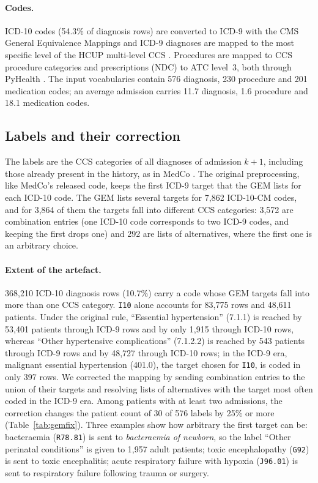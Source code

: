 \documentclass[11pt]{article}
\begin{document}
\paragraph{Codes.} ICD-10 codes (54.3\% of diagnosis rows) are converted to ICD-9 with the CMS General
Equivalence Mappings \citep{cms2018gem} and ICD-9 diagnoses are mapped to the most specific level of the HCUP
multi-level CCS \citep{hcup2015}. Procedures are mapped to CCS procedure categories and prescriptions (NDC) to ATC
level~3, both through PyHealth \citep{yang2023pyhealth}. The input vocabularies contain 576 diagnosis, 230
procedure and 201 medication codes; an average admission carries 11.7 diagnosis, 1.6 procedure and 18.1
medication codes.

\subsection{Labels and their correction}\label{sec:labelfix}

The labels are the CCS categories of all diagnoses of admission $k+1$, including those already present in the
history, as in MedCo \citep{medco2026}. The original preprocessing, like MedCo's released code, keeps the first
ICD-9 target that the GEM lists for each ICD-10 code. The GEM lists several targets for 7,862 ICD-10-CM codes, and
for 3,864 of them the targets fall into different CCS categories: 3,572 are combination entries (one ICD-10 code
corresponds to two ICD-9 codes, and keeping the first drops one) and 292 are lists of alternatives, where the
first one is an arbitrary choice.

\paragraph{Extent of the artefact.} 368,210 ICD-10 diagnosis rows (10.7\%) carry a code whose GEM targets fall
into more than one CCS category. \texttt{I10} alone accounts for 83,775 rows and 48,611 patients. Under the
original rule, ``Essential hypertension'' (7.1.1) is reached by 53,401 patients through ICD-9 rows and by only
1,915 through ICD-10 rows, whereas ``Other hypertensive complications'' (7.1.2.2) is reached by 543 patients
through ICD-9 rows and by 48,727 through ICD-10 rows; in the ICD-9 era, malignant essential hypertension (401.0),
the target chosen for \texttt{I10}, is coded in only 397 rows. We corrected the mapping by sending combination
entries to the union of their targets and resolving lists of alternatives with the target most often coded in
the ICD-9 era. Among patients with at least two admissions, the correction changes the patient count of 30 of
576 labels by 25\% or more (Table~\ref{tab:gemfix}). Three examples show how arbitrary the first target can be:
bacteraemia (\texttt{R78.81}) is sent to \emph{bacteraemia of newborn}, so the label ``Other perinatal
conditions'' is given to 1,957 adult patients; toxic encephalopathy (\texttt{G92}) is sent to toxic
encephalitis; acute respiratory failure with hypoxia (\texttt{J96.01}) is sent to respiratory failure following
trauma or surgery.
\end{document}

